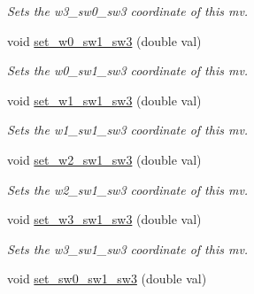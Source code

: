 \begin{DoxyCompactItemize}
\begin{DoxyCompactList}\small\item\em Sets the w3\-\_\-sw0\-\_\-sw3 coordinate of this mv. \end{DoxyCompactList}\item 
\hypertarget{classe3ga_1_1mv_aa3cca896c2627018f402b84d9d52bb33}{void \hyperlink{classe3ga_1_1mv_aa3cca896c2627018f402b84d9d52bb33}{set\-\_\-w0\-\_\-sw1\-\_\-sw3} (double val)}\label{classe3ga_1_1mv_aa3cca896c2627018f402b84d9d52bb33}

\begin{DoxyCompactList}\small\item\em Sets the w0\-\_\-sw1\-\_\-sw3 coordinate of this mv. \end{DoxyCompactList}\item 
\hypertarget{classe3ga_1_1mv_aca285b1e1b862708e4bd7e4f99ac9522}{void \hyperlink{classe3ga_1_1mv_aca285b1e1b862708e4bd7e4f99ac9522}{set\-\_\-w1\-\_\-sw1\-\_\-sw3} (double val)}\label{classe3ga_1_1mv_aca285b1e1b862708e4bd7e4f99ac9522}

\begin{DoxyCompactList}\small\item\em Sets the w1\-\_\-sw1\-\_\-sw3 coordinate of this mv. \end{DoxyCompactList}\item 
\hypertarget{classe3ga_1_1mv_a3acac4735f3ac17d91d2e44f66474ec7}{void \hyperlink{classe3ga_1_1mv_a3acac4735f3ac17d91d2e44f66474ec7}{set\-\_\-w2\-\_\-sw1\-\_\-sw3} (double val)}\label{classe3ga_1_1mv_a3acac4735f3ac17d91d2e44f66474ec7}

\begin{DoxyCompactList}\small\item\em Sets the w2\-\_\-sw1\-\_\-sw3 coordinate of this mv. \end{DoxyCompactList}\item 
\hypertarget{classe3ga_1_1mv_a5e5f244e59fe5d149bc0cc33f3567060}{void \hyperlink{classe3ga_1_1mv_a5e5f244e59fe5d149bc0cc33f3567060}{set\-\_\-w3\-\_\-sw1\-\_\-sw3} (double val)}\label{classe3ga_1_1mv_a5e5f244e59fe5d149bc0cc33f3567060}

\begin{DoxyCompactList}\small\item\em Sets the w3\-\_\-sw1\-\_\-sw3 coordinate of this mv. \end{DoxyCompactList}\item 
\hypertarget{classe3ga_1_1mv_a7d71c5ca3948271ab65a61520ba69fed}{void \hyperlink{classe3ga_1_1mv_a7d71c5ca3948271ab65a61520ba69fed}{set\-\_\-sw0\-\_\-sw1\-\_\-sw3} (double val)}\label{classe3ga_1_1mv_a7d71c5ca3948271ab65a61520ba69fed}


\end{DoxyCompactItemize}
